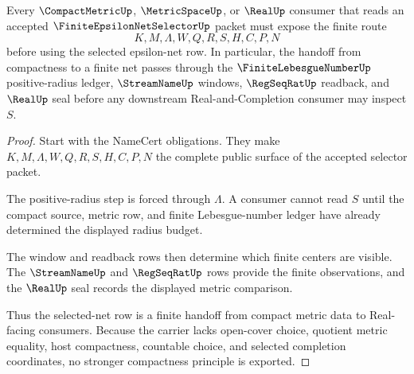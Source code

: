 \begin{theorem}\label{thm:finite-epsilon-net-choice-compact-handoff}
Every $\CompactMetricUp$, $\MetricSpaceUp$, or $\RealUp$ consumer that reads an accepted $\FiniteEpsilonNetSelectorUp$ packet must expose the finite route
$$
K,M,\Lambda,W,Q,R,S,H,C,P,N
$$
before using the selected epsilon-net row. In particular, the handoff from compactness to a finite net passes through the $\FiniteLebesgueNumberUp$ positive-radius ledger, $\StreamNameUp$ windows, $\RegSeqRatUp$ readback, and $\RealUp$ seal before any downstream Real-and-Completion consumer may inspect $S$.
\end{theorem}
\begin{proof}
Start with the NameCert obligations. They make $K,M,\Lambda,W,Q,R,S,H,C,P,N$ the complete public surface of the accepted selector packet.

The positive-radius step is forced through $\Lambda$. A consumer cannot read $S$ until the compact source, metric row, and finite Lebesgue-number ledger have already determined the displayed radius budget.

The window and readback rows then determine which finite centers are visible. The $\StreamNameUp$ and $\RegSeqRatUp$ rows provide the finite observations, and the $\RealUp$ seal records the displayed metric comparison.

Thus the selected-net row is a finite handoff from compact metric data to Real-facing consumers. Because the carrier lacks open-cover choice, quotient metric equality, host compactness, countable choice, and selected completion coordinates, no stronger compactness principle is exported.
\end{proof}




